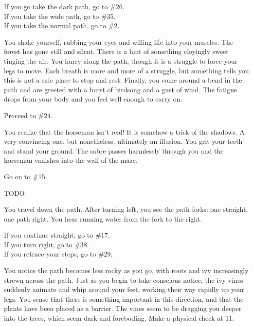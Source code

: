 \documentclass[green]{gl2018}
\begin{document}
\begin{large}
\begin{location}{3}
\begin{fromhere}
 If you go take the dark path, go to \#26.\\
 If you take the wide path, go to \#35.\\
 If you take the normal path, go to \#2.
\end{fromhere}
\end{location}
\begin{location}{4}
You shake yourself, rubbing your eyes and willing life into your muscles.  The forest has gone still and silent.  There is a hint of something cloyingly sweet tinging the air.  You hurry along the path, though it is a struggle to force your legs to move.  Each breath is more and more of a struggle, but something tells you this is not a safe place to stop and rest.  Finally,  you come around a bend in the path and are greeted with a burst of birdsong and a gust of wind.  The fatigue drops from your body and you feel well enough to carry on.  
\begin{fromhere}
Proceed to \#24.
\end{fromhere}
\end{location}
\begin{location}{5}
You realize that the horseman isn't real! It is somehow a trick of the shadows. A very convincing one, but nonetheless, ultimately an illusion. You grit your teeth and stand your ground. The sabre passes harmlessly through you and the horseman vanishes into the wall of the maze. 
\begin{fromhere} Go on to \#15.\end{fromhere}
\end{location}
\begin{location}{6}
TODO
\end{location}
\begin{location}{7}
You travel down the path. After turning left, you see the path forks: one straight, one path right. You hear running water from the fork to the right. 
\begin{fromhere}
If you continue straight, go to \#17.\\
If you turn right,  go to \#38.\\
  If you retrace your steps, go to \#29.
\end{fromhere}
\end{location}
\begin{location}{8}
You notice the path becomes less rocky as you go, with roots and ivy increasingly strewn across the path.  Just as you begin to take conscious notice, the ivy vines suddenly animate and whip around your feet, working their way rapidly up your legs.  You sense that there is something important in this direction, and that the plants have been placed as a barrier.  The vines seem to be dragging you deeper into the trees, which seem dark and foreboding.  Make a physical check at 11.

\end{location}
\end{large}
\end{document}
